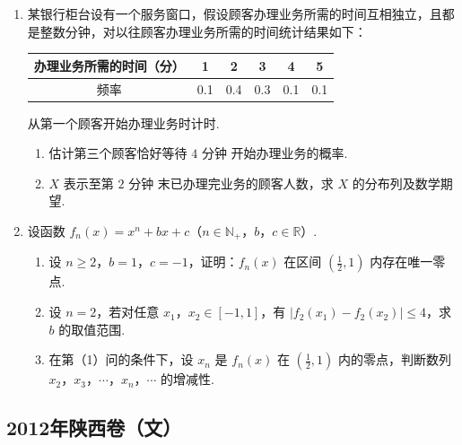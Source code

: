 \begin{description}
\begin{enumerate}[leftmargin=5pt]
        \item 某银行柜台设有一个服务窗口，假设顾客办理业务所需的时间互相独立，且都是整数分钟，对以往顾客办理业务所需的时间统计结果如下：

\begin{center}
\begin{tabular}{c|ccccc}
办理业务所需的时间（分） & 1 & 2 & 3 & 4 & 5 \\
\hline
频率 & 0.1 & 0.4 & 0.3 & 0.1 & 0.1
\end{tabular}
\end{center}

从第一个顾客开始办理业务时计时.

\begin{enumerate}
\item 估计第三个顾客恰好等待 \(4\text{ 分钟}\) 开始办理业务的概率.
\item \(X\) 表示至第 \(2\text{ 分钟}\) 末已办理完业务的顾客人数，求 \(X\) 的分布列及数学期望.
\end{enumerate}

        \item 设函数 \(f_{n}(x) = x^{n} + bx + c\)（\(n \in \mathbb{N}_+\)，\(b\)，\(c \in \mathbb{R}\)）.

\begin{enumerate}
\item 设 \(n \geqslant 2\)，\(b = 1\)，\(c = -1\)，证明：\(f_n(x)\) 在区间 \(\left(\frac{1}{2}, 1\right)\) 内存在唯一零点.
\item 设 \(n = 2\)，若对任意 \(x_1\)，\(x_2 \in [-1, 1]\)，有 \(|f_2(x_1) - f_2(x_2)| \leqslant 4\)，求 \(b\) 的取值范围.
\item 在第（1）问的条件下，设 \(x_{n}\) 是 \(f_{n}(x)\) 在 \(\left(\frac{1}{2}, 1\right)\) 内的零点，判断数列 \(x_{2}\)，\(x_{3}\)，\(\cdots\)，\(x_{n}\)，\(\cdots\) 的增减性.
\end{enumerate}

    \end{enumerate}

\end{description}


\subsection{2012年陕西卷（文）}\label{gk:2012年陕西卷（文）}

